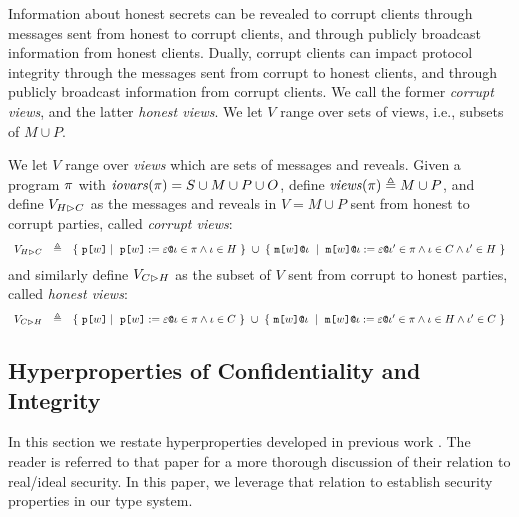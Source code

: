 Information about honest secrets can be revealed to corrupt clients
through messages sent from honest to corrupt clients, and through
publicly broadcast information from honest clients. Dually,
corrupt clients can impact protocol integrity through the messages
sent from corrupt to honest clients, and through publicly broadcast information
from corrupt clients. We call the former \emph{corrupt views}, and
the latter \emph{honest views}. We let $V$ range over sets
of views, i.e., subsets of $M \cup P$.
\begin{definition}
  We let $V$ range over \emph{views} which are sets of messages
  and reveals. Given a program $\pi$ with $\mathit{iovars}(\pi) = S \cup M \cup P \cup O$,
  define $\mathit{views}(\pi) \triangleq M \cup P$, and define $V_{H \rhd C}$ as
  the messages and reveals in $V = M \cup P$ sent from honest to corrupt
  parties, called \emph{corrupt views}:
  $$
  \begin{array}{lcl}
    \houtputs & \defeq
        & \{\ \rvl{w} \mid\ \reveal{w}{\be}{\cid} \in \prog \wedge \cid \in H \ \}\ \cup\ %
    \{\ \elab{\mesg{w}}{\cid}\ \mid\  \eassign{\mesg{w}}{\cid}{\be}{\cid'} \in
           \prog \wedge \cid \in C \wedge \cid' \in H \ \} 
  \end{array}
  $$
  and similarly define $V_{C \rhd H}$ as the subset of $V$ sent from corrupt to honest
  parties, called \emph{honest views}:
  $$
  \begin{array}{lcl}
    \cinputs &  \defeq
        & \{\ \rvl{w} \mid\ \reveal{w}{\be}{\cid} \in \prog \wedge \cid \in C \ \} \ \cup\ %
    \{\ \elab{\mesg{w}}{\cid}\ \mid\  \eassign{\mesg{w}}{\cid}{\be}{\cid'} \in
              \prog \wedge \cid \in H \wedge \cid' \in C \ \}
  \end{array}
  $$
\end{definition}

\subsection{Hyperproperties of Confidentiality and Integrity}

In this section we restate hyperproperties developed in previous work
\cite{skalka-near-ppdp24}. The reader is referred to that paper for a more
thorough discussion of their relation to real/ideal security. In this
paper, we leverage that relation to establish security properties in
our type system.

